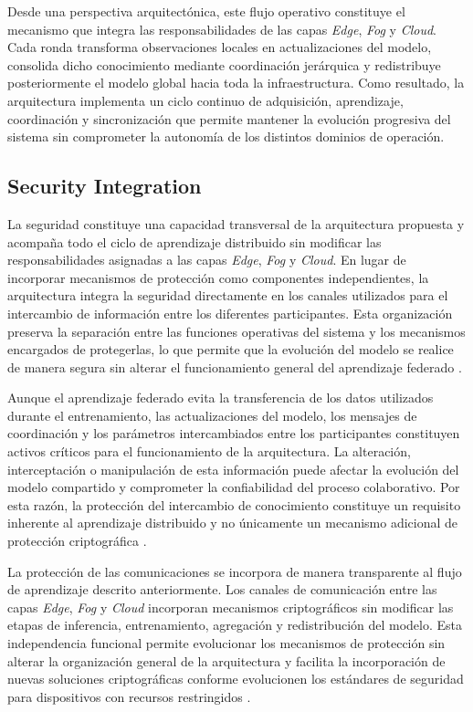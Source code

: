 \documentclass[journal,article,submit,moreauthors]{Definitions/mdpi}
\begin{document}
Desde una perspectiva arquitectónica, este flujo operativo constituye el mecanismo que integra las responsabilidades de las capas \textit{Edge}, \textit{Fog} y \textit{Cloud}. Cada ronda transforma observaciones locales en actualizaciones del modelo, consolida dicho conocimiento mediante coordinación jerárquica y redistribuye posteriormente el modelo global hacia toda la infraestructura. Como resultado, la arquitectura implementa un ciclo continuo de adquisición, aprendizaje, coordinación y sincronización que permite mantener la evolución progresiva del sistema sin comprometer la autonomía de los distintos dominios de operación.

\subsection{Security Integration}
La seguridad constituye una capacidad transversal de la arquitectura propuesta y acompaña todo el ciclo de aprendizaje distribuido sin modificar las responsabilidades asignadas a las capas \textit{Edge}, \textit{Fog} y \textit{Cloud}. En lugar de incorporar mecanismos de protección como componentes independientes, la arquitectura integra la seguridad directamente en los canales utilizados para el intercambio de información entre los diferentes participantes. Esta organización preserva la separación entre las funciones operativas del sistema y los mecanismos encargados de protegerlas, lo que permite que la evolución del modelo se realice de manera segura sin alterar el funcionamiento general del aprendizaje federado \cite{Alshammari2026,Bunko2026}.

Aunque el aprendizaje federado evita la transferencia de los datos utilizados durante el entrenamiento, las actualizaciones del modelo, los mensajes de coordinación y los parámetros intercambiados entre los participantes constituyen activos críticos para el funcionamiento de la arquitectura. La alteración, interceptación o manipulación de esta información puede afectar la evolución del modelo compartido y comprometer la confiabilidad del proceso colaborativo. Por esta razón, la protección del intercambio de conocimiento constituye un requisito inherente al aprendizaje distribuido y no únicamente un mecanismo adicional de protección criptográfica \cite{NIST800232,Kaur2025,Gusita2025}.

La protección de las comunicaciones se incorpora de manera transparente al flujo de aprendizaje descrito anteriormente. Los canales de comunicación entre las capas \textit{Edge}, \textit{Fog} y \textit{Cloud} incorporan mecanismos criptográficos sin modificar las etapas de inferencia, entrenamiento, agregación y redistribución del modelo. Esta independencia funcional permite evolucionar los mecanismos de protección sin alterar la organización general de la arquitectura y facilita la incorporación de nuevas soluciones criptográficas conforme evolucionen los estándares de seguridad para dispositivos con recursos restringidos \cite{NIST800232,Kaur2025,Alshammari2026,Sorescu2025}.
\end{document}
